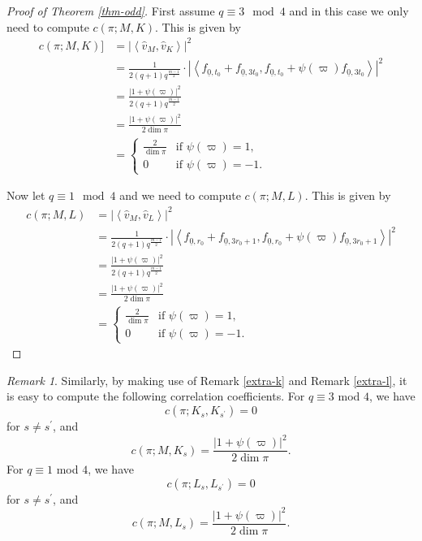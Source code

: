 \documentclass[12pt]{amsart}
\theoremstyle{definition}
\theoremstyle{remark}
\newtheorem{remark}{Remark}
\begin{document}
\begin{proof}[Proof of Theorem \ref{thm-odd}]
First assume $q \equiv 3 \mod 4$ and in this case we only need to compute $c(\pi;M,K)$. This is given by
\begin{align*}
c(\pi;M,K)] &= |\left\langle \hat{v}_M, \hat{v}_K \right\rangle|^2\\
&= \frac{1}{2 (q+1) q^{\frac{m-1}{2}}} \cdot |\left\langle  f_{\underline{0}, t_0} + f_{\underline{0}, 3t_0}, f_{\underline{0}, t_0} + \psi(\varpi) f_{\underline{0}, 3t_0} \right\rangle|^2 \\
&=  \frac{|1 + \psi(\varpi)|^2}{2(q+1)q^{\frac{m-1}{2}}} \\ 
&= \frac{|1 + \psi(\varpi)|^2}{2 \dim \pi} \\
&=
\begin{cases}
\frac{2}{\dim \pi}  &\text{if $\psi(\varpi) = 1$,} \\
0  &\text{if $\psi(\varpi) = -1$.}
\end{cases}
\end{align*}

Now let $q \equiv 1 \mod  4$ and we need to compute $c(\pi;M,L)$. This is given by 
\begin{align*}
c(\pi; M, L) &= |\left\langle \hat{v}_M, \hat{v}_L \right\rangle|^2\\
&= \frac{1}{2 (q+1) q^{\frac{m-1}{2}}} \cdot |\left\langle  f_{\underline{0}, r_0} + f_{\underline{0}, 3r_0+1}, f_{\underline{0}, r_0} + \psi(\varpi) f_{\underline{0}, 3r_0+1} \right\rangle|^2 \\
&=  \frac{|1 + \psi(\varpi)|^2}{2(q+1)q^{\frac{m-1}{2}}} \\ 
&= \frac{|1 + \psi(\varpi)|^2}{2 \dim \pi} \\
&=
\begin{cases}
\frac{2}{\dim \pi}  &\text{if $\psi(\varpi) = 1$,} \\
0  &\text{if $\psi(\varpi) = -1$.}
\end{cases}
\end{align*}
\end{proof}

\begin{remark}\label{extra-proof}
Similarly, by making use of Remark \ref{extra-k} and Remark \ref{extra-l}, it is easy to compute the following correlation coefficients. For $q \equiv 3$ mod $4$, we have 
\[c(\pi; K_{s}, K_{s^\prime}) = 0\] for $s \neq s^\prime$, and  
\[c(\pi; M, K_{s})=  \frac{|1 + \psi(\varpi)|^2}{2 \dim \pi}.\]
For $q \equiv 1$ mod $4$, we have 
\[c(\pi; L_{s}, L_{s^\prime}) = 0\] for $s \neq s^\prime$, and  
\[c(\pi; M, L_{s})=  \frac{|1 + \psi(\varpi)|^2}{2 \dim \pi}.\]
\end{remark}
\end{document}
